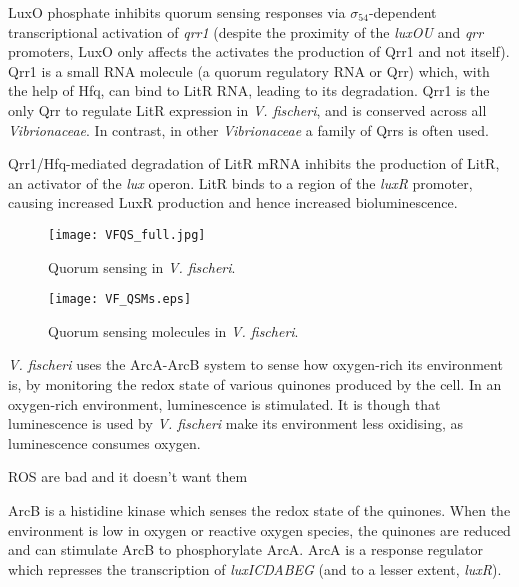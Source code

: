 LuxO phosphate inhibits quorum sensing responses via $\sigma_{54}$-dependent transcriptional activation of \textit{qrr1}\cite{Miyamoto2000,Miyashiro2010} (despite the proximity of the \textit{luxOU} and \textit{qrr} promoters, LuxO only affects the activates the production of Qrr1 and not itself\cite{Lilley2000}). Qrr1 is a small RNA molecule (a quorum regulatory RNA or Qrr) which, with the help of Hfq, can bind to LitR RNA, leading to its degradation\cite{Miyashiro2010}. Qrr1 is the only Qrr to regulate LitR expression in \textit{V. fischeri}, and is conserved across all \textit{Vibrionaceae}\cite{Miyashiro2010}. In contrast, in other \textit{Vibrionaceae} a family of Qrrs is often used\cite{Lenz2004}.

Qrr1/Hfq-mediated degradation of LitR mRNA inhibits the production of LitR, an activator of the \textit{lux} operon. LitR binds to a region of the \textit{luxR} promoter, causing increased LuxR production and hence increased bioluminescence\cite{Fidopiastis2002}.


\begin{figure}[H]
	\begin{center}
		\texttt{[image: VFQS\_full.jpg]}
		\caption{Quorum sensing in \textit{V. fischeri}. \label{fig:VFQS_full}}
	\end{center}
\end{figure}

\begin{figure}[H]
	\begin{center}
		\texttt{[image: VF\_QSMs.eps]}
		\caption{Quorum sensing molecules in \textit{V. fischeri}. \label{fig:VF_QSMs}}
	\end{center}
\end{figure}

 \label{sec:O2}

\textit{V. fischeri} uses the ArcA-ArcB system to sense how oxygen-rich its environment is, by monitoring the redox state of various quinones produced by the cell. 
In an oxygen-rich environment, luminescence is stimulated. It is though that luminescence is used by \textit{V. fischeri} make its environment less oxidising, as luminescence consumes oxygen. 

ROS are bad and it doesn't want them\cite{Visick2000}

 ArcB is a histidine kinase which senses the redox state of the quinones. When the environment is low in oxygen or reactive oxygen species, the quinones are reduced and can stimulate ArcB to phosphorylate ArcA. ArcA is a response regulator which represses the transcription of \textit{luxICDABEG} (and to a lesser extent, \textit{luxR}). 

